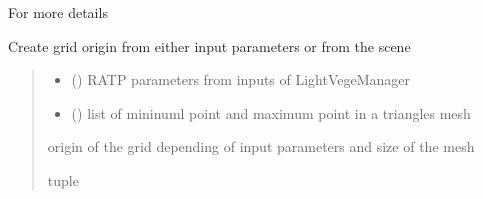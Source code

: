 \documentclass[letterpaper,10pt,english]{sphinxmanual}
\begin{document}
\nopagebreak


\sphinxAtStartPar
For more details {\hyperref[\detokenize{inputs:inputs}]{}}



\begin{fulllineitems}
\label{\detokenize{reference:buildRATPscene.extract_grid_origin}}
\pysigstartsignatures
{}
\pysigstopsignatures
\sphinxAtStartPar
Create grid origin from either input parameters or from the scene
\begin{quote}\begin{description}
\begin{itemize}
\item {} 
\sphinxAtStartPar
{} () \textendash{} RATP parameters from inputs of LightVegeManager

\item {} 
\sphinxAtStartPar
{} (\sphinxstyleliteralemphasis{\sphinxupquote{{[}}}\sphinxstyleliteralemphasis{\sphinxupquote{, }}\sphinxstyleliteralemphasis{\sphinxupquote{{]}}}) \textendash{} list of mininuml point and maximum point in a triangles mesh

\end{itemize}

\sphinxAtStartPar
origin of the grid depending of input parameters and size of the mesh

\sphinxhyphen{}tuple

\end{description}\end{quote}

\end{fulllineitems}

\end{document}
